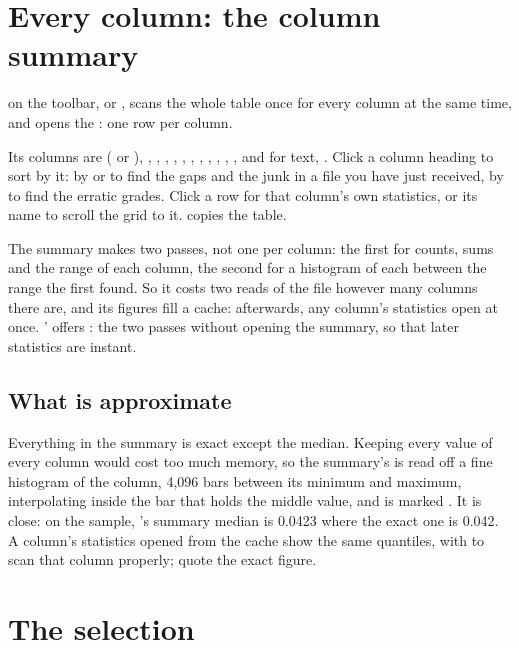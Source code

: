 \section{Every column: the column summary}\label{sec:summary}

 on the toolbar, or , scans the whole table once for
every column at the same time, and opens the : one row per column.


Its columns are  ( or ), , , , , ,
, , , , , , and for text, . Click a column
heading to sort by it: by  or  to find the gaps and the junk in a file you have just
received, by  to find the erratic grades. Click a row for that column's own statistics, or its
name to scroll the grid to it.  copies the table.

The summary makes two passes, not one per column: the first for counts, sums and the range of each
column, the second for a histogram of each between the range the first found. So it costs two reads of
the file however many columns there are, and its figures fill a cache: afterwards, any column's
statistics open at once. '  offers : the two passes
without opening the summary, so that later statistics are instant.

\subsection{What is approximate}

Everything in the summary is exact except the median. Keeping every value of every column would cost
too much memory, so the summary's  is read off a fine histogram of the column, 4{,}096 bars
between its minimum and maximum, interpolating inside the bar that holds the middle value, and is marked
. It is close: on the sample, 's summary median is 0.0423 where the exact one is
0.042. A column's statistics opened from the cache show the same  quantiles, with  to scan that column properly; quote the exact figure.

\section{The selection}\label{sec:selection-stats}

